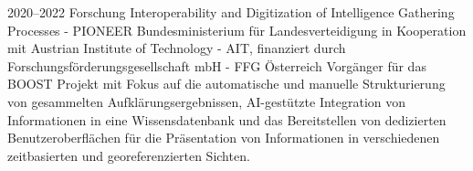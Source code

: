 \cventry
{2020--2022}
{Forschung}
{Interoperability and Digitization of Intelligence Gathering Processes - PIONEER}
{
  Bundesministerium für Landesverteidigung
  in Kooperation mit Austrian Institute of Technology - AIT,
  finanziert durch Forschungsförderungsgesellschaft mbH - FFG}
{Österreich}
{
  Vorgänger für das BOOST Projekt mit Fokus auf die automatische und manuelle
  Strukturierung von gesammelten Aufklärungsergebnissen, AI-gestützte Integration
  von Informationen in eine Wissensdatenbank und das Bereitstellen von dedizierten
  Benutzeroberflächen für die Präsentation von Informationen in verschiedenen
  zeitbasierten und georeferenzierten Sichten.
}
